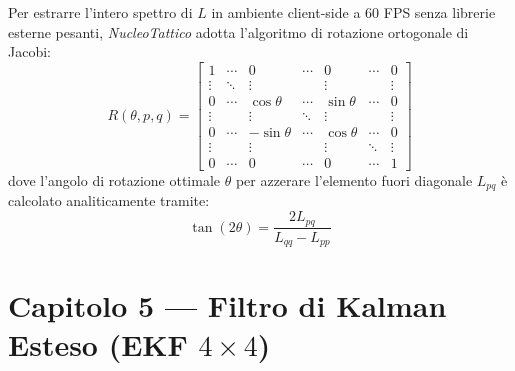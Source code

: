 \documentclass[11pt,a4paper]{article}
\begin{document}
Per estrarre l'intero spettro di $L$ in ambiente client-side a 60 FPS senza librerie esterne pesanti, \textsl{NucleoTattico} adotta l'algoritmo di rotazione ortogonale di Jacobi:
\begin{equation}
R(\theta, p, q) = \begin{bmatrix}
1 & \cdots & 0 & \cdots & 0 & \cdots & 0 \\
\vdots & \ddots & \vdots & & \vdots & & \vdots \\
0 & \cdots & \cos\theta & \cdots & \sin\theta & \cdots & 0 \\
\vdots & & \vdots & \ddots & \vdots & & \vdots \\
0 & \cdots & -\sin\theta & \cdots & \cos\theta & \cdots & 0 \\
\vdots & & \vdots & & \vdots & \ddots & \vdots \\
0 & \cdots & 0 & \cdots & 0 & \cdots & 1
\end{bmatrix}
\end{equation}
dove l'angolo di rotazione ottimale $\theta$ per azzerare l'elemento fuori diagonale $L_{pq}$ è calcolato analiticamente tramite:
\begin{equation}
\tan(2\theta) = \frac{2 L_{pq}}{L_{qq} - L_{pp}}
\end{equation}


\section{Capitolo 5 — Filtro di Kalman Esteso (EKF $4 \times 4$)}
\end{document}
